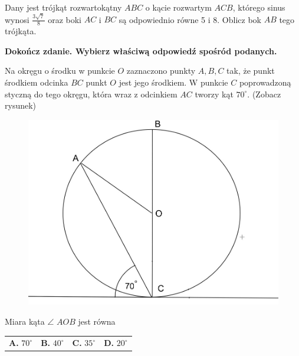 \documentclass[12pt,a4paper]{article}
\theoremstyle{break}
\begin{document}
	
	\begin{zad}[0-3]
		Dany jest trójkąt rozwartokątny $ABC$ o kącie rozwartym $ACB$, którego sinus wynosi $\frac{3\sqrt{7}}{8}$ oraz boki $AC$ i $BC$ są odpowiednio równe 5 i 8. Oblicz bok $AB$ tego trójkąta.
	\end{zad} 
	
	\newpage
	
	\begin{zad}[0-1]
		\textbf{Dokończ zdanie. Wybierz właściwą odpowiedź spośród podanych.}
	\end{zad} 
	
	Na okręgu o środku w punkcie $O$ zaznaczono punkty $A,B,C$ tak, że punkt środkiem odcinka $BC$ punkt $O$ jest jego środkiem. W punkcie $C$ poprowadzoną styczną do tego okręgu, która wraz z odcinkiem $AC$ tworzy kąt $70^\circ$. (Zobacz rysunek) 
	
	\begin{figure}[h]
		\centering
		\includegraphics[scale=0.5]{pm4.jpeg}
	\end{figure}
	
	Miara kąta $\angle$ $AOB$ jest równa
	
	\vspace{0.5cm}
	\begin{tabular}{p{3.5cm} p{3.5cm} p{3.5cm} p{3.5cm}}
		\textbf{A. }$70^\circ$&
		\textbf{B. }$40^\circ$&
		\textbf{C. }$35^\circ$&
		\textbf{D. }$20^\circ$\\
	\end{tabular}
\end{document}
